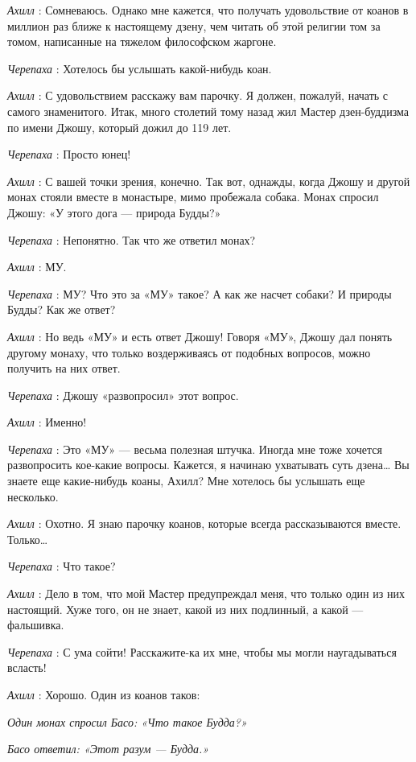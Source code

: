 \emph{Ахилл} : Сомневаюсь. Однако мне кажется, что получать удовольствие от коанов в миллион раз ближе к настоящему дзену, чем читать об этой религии том за томом, написанные на тяжелом философском жаргоне.

\emph{Черепаха} : Хотелось бы услышать какой-нибудь коан.

\emph{Ахилл} : С удовольствием расскажу вам парочку. Я должен, пожалуй, начать с самого знаменитого. Итак, много столетий тому назад жил Мастер дзен-буддизма по имени Джошу, который дожил до 119 лет.

\emph{Черепаха} : Просто юнец!

\emph{Ахилл} : С вашей точки зрения, конечно. Так вот, однажды, когда Джошу и другой монах стояли вместе в монастыре, мимо пробежала собака. Монах спросил Джошу: «У этого дога --- природа Будды?»

\emph{Черепаха} : Непонятно. Так что же ответил монах?

\emph{Ахилл} : МУ.

\emph{Черепаха} : МУ? Что это за «МУ» такое? А как же насчет собаки? И природы Будды? Как же ответ?

\emph{Ахилл} : Но ведь «МУ» и есть ответ Джошу! Говоря «МУ», Джошу дал понять другому монаху, что только воздерживаясь от подобных вопросов, можно получить на них ответ.

\emph{Черепаха} : Джошу «развопросил» этот вопрос.

\emph{Ахилл} : Именно!

\emph{Черепаха} : Это «МУ» --- весьма полезная штучка. Иногда мне тоже хочется развопросить кое-какие вопросы. Кажется, я начинаю ухватывать суть дзена\ldots{} Вы знаете еще какие-нибудь коаны, Ахилл? Мне хотелось бы услышать еще несколько.

\emph{Ахилл} : Охотно. Я знаю парочку коанов, которые всегда рассказываются вместе. Только\ldots{}

\emph{Черепаха} : Что такое?

\emph{Ахилл} : Дело в том, что мой Мастер предупреждал меня, что только один из них настоящий. Хуже того, он не знает, какой из них подлинный, а какой --- фальшивка.

\emph{Черепаха} : С ума сойти! Расскажите-ка их мне, чтобы мы могли наугадываться всласть!

\emph{Ахилл} : Хорошо. Один из коанов таков:

\emph{Один монах спросил Басо: «Что такое Будда?»}

\emph{Басо ответил: «Этот разум --- Будда.»}

